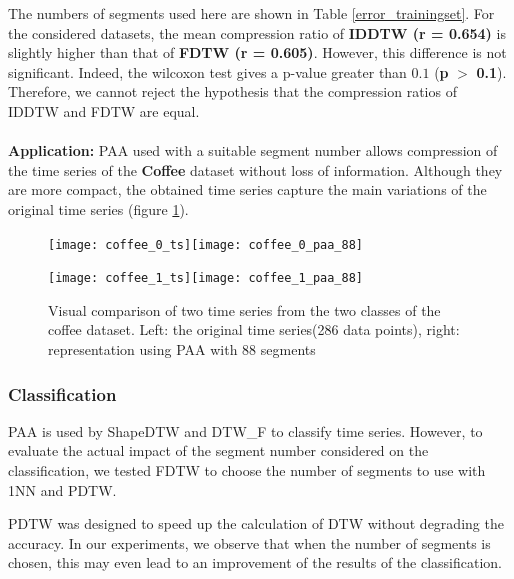 The numbers of segments used here are shown in Table \ref{error_trainingset}. For the considered datasets, the mean compression ratio of \textbf{IDDTW (r = 0.654)}  is slightly higher than that
of \textbf{FDTW (r = 0.605)}. However, this difference is not significant. Indeed, the wilcoxon test
gives a p-value greater than $0.1$ (\textbf{p} $>$ \textbf{0.1}). Therefore, we cannot reject the hypothesis that the
compression ratios of IDDTW and FDTW are equal.
\\

\paragraph{}\textbf{Application: } 
PAA used with a suitable segment number allows compression of the time series of
the \textbf{Coffee} dataset without loss of information. Although they are more compact, the obtained time series
capture the main variations of the original time series (figure \ref{coffee}).

\begin{figure}
\center

\texttt{[image: coffee\_0\_ts]}\texttt{[image: coffee\_0\_paa\_88]}

\texttt{[image: coffee\_1\_ts]}\texttt{[image: coffee\_1\_paa\_88]}

\caption{Visual comparison of two time series from the two classes of the coffee dataset. Left: the original time series(286 data points), right:  representation using PAA with 88 segments}

\label{coffee}
\end{figure}


\subsubsection{Classification}

PAA is used by ShapeDTW \cite{zhao2016shapedtw} and DTW\_F \cite{Kate2016} to classify time series. However, to evaluate the actual impact of the segment number considered on the classification, we tested FDTW to choose the
number of segments to use with 1NN and PDTW. 


PDTW was designed to speed up the calculation of DTW without degrading the accuracy. In our experiments, we observe that when the number of segments is chosen, this may even lead to an improvement of the results of the classification.



\\
